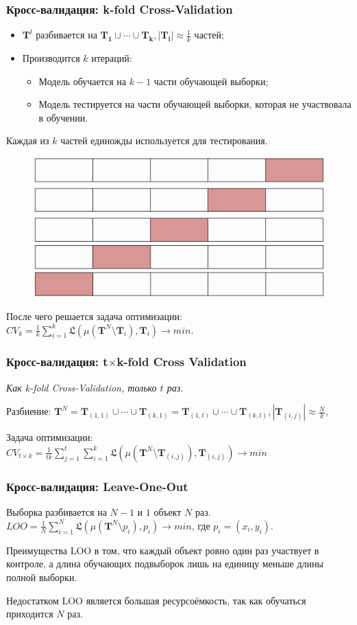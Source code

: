 \documentclass[11pt]{beamer}
\begin{document}
    \begin{frame}
		\frametitle{Кросс-валидация: k-fold Cross-Validation}
		\begin{itemize}
			\item $\bm{T}^l$ разбивается на $ \bm{T_1}\cup\cdots\cup\bm{T_k}, |\bm{T_i}|\approx \frac{1}{k} $ частей;
			\item Производится $ k $ итераций:
			\begin{itemize}
				\item Модель обучается на $ k-1 $ части обучающей выборки;
				\item Модель тестируется на части обучающей выборки, которая не участвовала в обучении.
			\end{itemize}
		\end{itemize}
		Каждая из $ k $ частей единожды используется для тестирования.
		
		\begin{figure}
			\includegraphics[width=0.4\linewidth]{imgs/K-fold-validation}
		\end{figure}
		После чего решается задача оптимизации:
		$CV_k = \frac{1}{k}\sum\limits_{i=1}^k\mathfrak{L}(\mu(\bm{T}^N \setminus \bm{T}_i), \bm{T}_i) \rightarrow min$.
	\end{frame}

	\begin{frame}
		\frametitle{Кросс-валидация: t$\times$k-fold Cross Validation}
		\begin{center}
			\textit{Как k-fold Cross-Validation, только $t$ раз.}
		\end{center}
		
		Разбиение:
		$\bm{T}^N = \bm{T}_{(1,1)}\cup\cdots\cup\bm{T}_{(k,1)}=\bm{T}_{(1,t)}\cup\cdots\cup\bm{T}_{(k,t)},|\bm{T}_{(i,j)}|\approx \frac{N}{k} $, 
		 
		Задача оптимизации: 
		$CV_{t\times k} = \frac{1}{tk}\sum\limits_{j=1}^t\sum\limits_{i=1}^k\mathfrak{L}(\mu(\bm{T}^N \setminus \bm{T}_{(i,j)}), \bm{T}_{(i,j)}) \rightarrow min$
	\end{frame}

	\begin{frame}
		\frametitle{Кросс-валидация: Leave-One-Out}
		Выборка разбивается на $ N-1 $ и $ 1 $ объект $ N $ раз.
		$LOO = \frac{1}{N}\sum\limits_{i=1}^N\mathfrak{L}(\mu(\bm{T}^N \setminus p_i), p_i) \rightarrow min$, где $ p_i = (x_i, y_i) $.
		
		Преимущества LOO в том, что каждый объект ровно один раз участвует в контроле, а длина обучающих подвыборок лишь на единицу меньше длины полной выборки.
		
		Недостатком LOO является большая ресурсоёмкость, так как обучаться приходится $ N $ раз.
	\end{frame}
\end{document}

